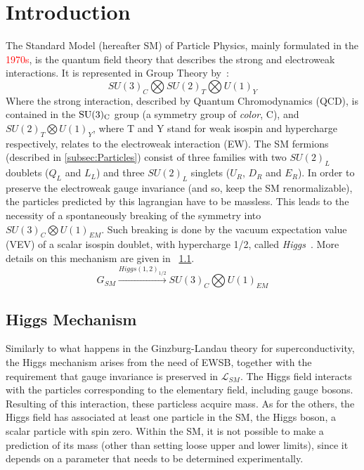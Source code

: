\chapter{Introduction}
\label{sec:introduction}
The Standard Model (hereafter SM) of Particle Physics, mainly formulated in the \textcolor{red}{1970s}, is the quantum field theory that describes the strong and electroweak interactions. It is represented in Group Theory by~\cite{PDG}:
\begin{equation}
SU(3)_C\bigotimes SU(2)_T \bigotimes U(1)_Y
\end{equation}
Where the strong interaction, described by Quantum Chromodynamics (QCD), is contained in the $\rm SU(3)_C$ group (a symmetry group of \textit{color}, C), and $SU(2)_T \bigotimes U(1)_Y$, where T and Y stand for weak isospin and hypercharge respectively, relates to the electroweak interaction (EW). 
The SM fermions (described in \ref{subsec:Particles}) consist of three families with two $SU(2)_L$ doublets ($Q_L$ and $L_L$) and three $SU(2)_L$ singlets ($U_R$, $D_R$ and $E_R$). %
In order to preserve the electroweak gauge invariance (and so, keep the SM renormalizable), the particles predicted by this lagrangian have to be massless. This leads to the necessity of a spontaneously breaking of the symmetry into $SU(3)_C \bigotimes U(1)_{EM}$. Such breaking is done by the vacuum expectation value (VEV) of a scalar isospin doublet, with hypercharge 1/2, called \textit{Higgs}~\cite{Higgs}. More details on this mechanism are given in ~\ref{subsec:Higgs}.
\begin{equation}
G_{SM} \xrightarrow{Higgs(1,2)_{1/2}} SU(3)_C \bigotimes U(1)_{EM}
\end{equation}

\section{Higgs Mechanism}
\label{subsec:Higgs}
Similarly to what happens in the Ginzburg-Landau theory for superconductivity, the Higgs mechanism arises from the need of EWSB, together with the requirement that gauge invariance is preserved in $\mathcal{L}_{SM}$. The Higgs field interacts with the particles corresponding to the elementary field, including gauge bosons. Resulting of this interaction, these particless acquire mass. 
As for the others, the Higgs field has associated at least one particle in the SM, the Higgs boson, a scalar particle with spin zero. Within the SM, it is not possible to make a prediction of its mass (other than setting loose upper and lower limits), since it depends on a parameter that needs to be determined experimentally. 

